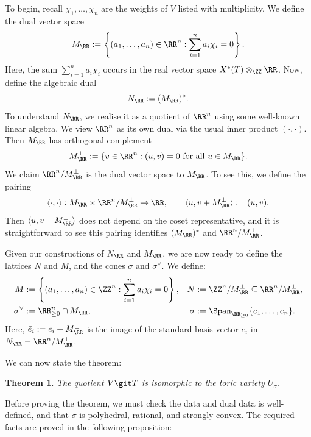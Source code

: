 \documentclass[12pt]{amsart}
\theoremstyle{plain}
\newtheorem{theorem}{Theorem}[subsection]
\theoremstyle{definition}
\begin{document}
To begin, recall $\chi_1, \ldots, \chi_n$ are the weights of $V$ listed with multiplicity.
We define the dual vector space
$$M_\RR := \left\{(a_1, \ldots, a_n) \in \RR^n : \sum_{i=1}^n a_i \chi_i = 0 \right\}.$$
Here, the sum $\sum_{i=1}^n a_i \chi_i$ occurs in the real vector space $X^*(T) \otimes_\ZZ \RR$.
Now, define the algebraic dual
$$N_\RR := (M_\RR)^*.$$
To understand $N_\RR$, we realise it as a quotient of $\RR^n$ using some well-known linear algebra.
We view $\RR^n$ as its own dual via the usual inner product $(\cdot,\cdot)$.
Then $M_\RR$ has orthogonal complement
$$M_\RR^\perp := \{v \in \RR^n : (u, v) = 0 \text{ for all }u \in M_\RR\}.$$
We claim $\RR^n / M_\RR^\perp$ is the dual vector space to $M_\RR$.
To see this, we define the pairing
$$\langle \cdot, \cdot \rangle : M_\RR \times \RR^n / M_\RR^\perp \to \RR, \qquad \langle u, v + M_\RR^\perp \rangle := (u, v).$$
Then $\langle u, v + M_\RR^\perp \rangle$ does not depend on the coset representative, and it is straightforward to see this pairing identifies $(M_\RR)^*$ and $\RR^n / M_\RR^\perp$.

Given our constructions of $N_\RR$ and $M_\RR$, we are now ready to define the lattices $N$ and $M$, and the cones $\sigma$ and $\sigma^\vee$.
We define:
\begin{align*}
	M &:= \left\{(a_1, \ldots, a_n) \in \ZZ^n : \sum_{i=1}^n a_i \chi_i = 0 \right\}, & N &:= \ZZ^n / M_\RR^\perp \subseteq \RR^n/M_\RR^\perp, \\
	\sigma^\vee &:= \RR_{\ge 0}^n \cap M_\RR, & \sigma &:= \Span_{\RR_{\ge 0}}\{\bar e_1, \ldots, \bar e_n\}.
\end{align*}
Here, $\bar e_i := e_i + M_\RR^\perp$ is the image of the standard basis vector $e_i$ in $N_\RR = \RR^n / M_\RR^\perp$.

We can now state the theorem:

\begin{theorem}\label{theorem:torusquotientsastoricvarieties}
The quotient $V \git T$ is isomorphic to the toric variety $U_\sigma$.
\end{theorem}

Before proving the theorem, we must check the data and dual data is well-defined, and that $\sigma$ is polyhedral, rational, and strongly convex.
The required facts are proved in the following proposition:
\end{document}
